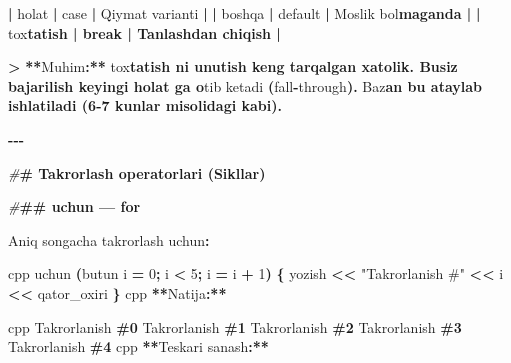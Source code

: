 \documentclass[a4paper,11pt,twoside,openright]{book}
\newenvironment{Shaded}{\begin{snugshade}}{\end{snugshade}}
\newcommand{\CharTok}[1]{\textcolor[rgb]{0.31,0.60,0.02}{#1}}
\newcommand{\DecValTok}[1]{\textcolor[rgb]{0.00,0.00,0.81}{#1}}
\newcommand{\ErrorTok}[1]{\textcolor[rgb]{0.64,0.00,0.00}{\textbf{#1}}}
\newcommand{\NormalTok}[1]{#1}
\newcommand{\OperatorTok}[1]{\textcolor[rgb]{0.81,0.36,0.00}{\textbf{#1}}}
\newcommand{\PreprocessorTok}[1]{\textcolor[rgb]{0.56,0.35,0.01}{\textit{#1}}}
\newcommand{\StringTok}[1]{\textcolor[rgb]{0.31,0.60,0.02}{#1}}
\begin{document}
\begin{Shaded}
\begin{Highlighting}[]
\OperatorTok{|} \ErrorTok{\textasciigrave{}}\NormalTok{holat}\ErrorTok{\textasciigrave{}} \OperatorTok{|} \ErrorTok{\textasciigrave{}}\NormalTok{case}\ErrorTok{\textasciigrave{}} \OperatorTok{|}\NormalTok{ Qiymat varianti }\OperatorTok{|}
\OperatorTok{|} \ErrorTok{\textasciigrave{}}\NormalTok{boshqa}\ErrorTok{\textasciigrave{}} \OperatorTok{|} \ErrorTok{\textasciigrave{}}\NormalTok{default}\ErrorTok{\textasciigrave{}} \OperatorTok{|}\NormalTok{ Moslik bo}\CharTok{\textquotesingle{}l}\ErrorTok{maganda |}
\OperatorTok{|} \ErrorTok{\textasciigrave{}}\NormalTok{to}\CharTok{\textquotesingle{}x}\ErrorTok{tatish\textasciigrave{} | \textasciigrave{}break\textasciigrave{} | Tanlashdan chiqish |}

\OperatorTok{\textgreater{}} \OperatorTok{**}\NormalTok{Muhim}\OperatorTok{:**} \ErrorTok{\textasciigrave{}}\NormalTok{to}\CharTok{\textquotesingle{}x}\ErrorTok{tatish\textasciigrave{} ni unutish keng tarqalgan xatolik. Busiz bajarilish keyingi \textasciigrave{}holat\textasciigrave{} ga o}\CharTok{\textquotesingle{}}\NormalTok{tib ketadi }\OperatorTok{(}\NormalTok{fall}\OperatorTok{{-}}\NormalTok{through}\OperatorTok{).}\NormalTok{ Ba}\CharTok{\textquotesingle{}z}\ErrorTok{an bu ataylab ishlatiladi (6{-}7 kunlar misolidagi kabi).}

\OperatorTok{{-}{-}{-}}

\PreprocessorTok{\#}\ErrorTok{\# Takrorlash operatorlari (Sikllar)}

\PreprocessorTok{\#}\ErrorTok{\#\# \textasciigrave{}uchun\textasciigrave{} — \textasciigrave{}for\textasciigrave{}}

\NormalTok{Aniq songacha takrorlash uchun}\OperatorTok{:}

\ErrorTok{\textasciigrave{}\textasciigrave{}\textasciigrave{}}\NormalTok{cpp}
\NormalTok{uchun }\OperatorTok{(}\NormalTok{butun i }\OperatorTok{=} \DecValTok{0}\OperatorTok{;}\NormalTok{ i }\OperatorTok{\textless{}} \DecValTok{5}\OperatorTok{;}\NormalTok{ i }\OperatorTok{=}\NormalTok{ i }\OperatorTok{+} \DecValTok{1}\OperatorTok{)} \OperatorTok{\{}
\NormalTok{    yozish }\OperatorTok{\textless{}\textless{}} \StringTok{"Takrorlanish \#"} \OperatorTok{\textless{}\textless{}}\NormalTok{ i }\OperatorTok{\textless{}\textless{}}\NormalTok{ qator\_oxiri}
\OperatorTok{\}}
\ErrorTok{\textasciigrave{}\textasciigrave{}\textasciigrave{}}\NormalTok{cpp}
\OperatorTok{**}\NormalTok{Natija}\OperatorTok{:**}

\ErrorTok{\textasciigrave{}\textasciigrave{}\textasciigrave{}}\NormalTok{cpp}
\NormalTok{Takrorlanish }\ErrorTok{\#0}
\NormalTok{Takrorlanish }\ErrorTok{\#1}
\NormalTok{Takrorlanish }\ErrorTok{\#2}
\NormalTok{Takrorlanish }\ErrorTok{\#3}
\NormalTok{Takrorlanish }\ErrorTok{\#4}
\ErrorTok{\textasciigrave{}\textasciigrave{}\textasciigrave{}}\NormalTok{cpp}
\OperatorTok{**}\NormalTok{Teskari sanash}\OperatorTok{:**}


\end{Highlighting}
\end{Shaded}
\end{document}
